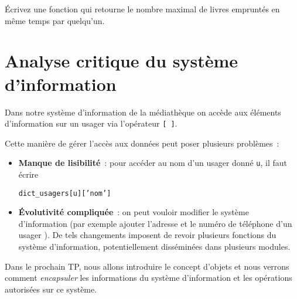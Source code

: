 \documentclass[10pt,a4paper]{sujets-exercices}
\begin{document}

Écrivez une fonction qui retourne le nombre maximal de livres empruntés en même temps par quelqu'un.


\section{Analyse critique du système d'information}

Dans notre système d'information de la médiathèque on accède aux éléments d'information sur un usager via l'opérateur \verb![ ]!. 

Cette manière de gérer l'accès aux données peut poser plusieurs problèmes~:

\begin{itemize}
\item \textbf{Manque de lisibilité}~: pour accéder au nom d'un usager donné \texttt{u}, il faut écrire 
\begin{center}
	\texttt{dict\_usagers[u]['nom']}
\end{center}
\item \textbf{Évolutivité compliquée}~: on peut vouloir modifier le système d'information (par exemple ajouter l'adresse et le numéro de téléphone d'un usager ). De tels changements imposent de revoir plusieurs fonctions du système d'information, potentiellement disséminées dans plusieurs modules.
\end{itemize}

Dans le prochain TP, nous allons introduire le concept d'objets et nous verrons comment \emph{encapsuler} les informations du système d'information et les opérations autorisées sur ce système.
\end{document}
